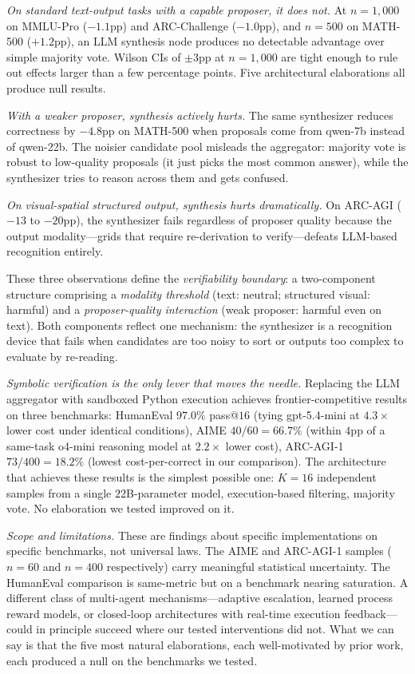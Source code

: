 \documentclass[11pt]{amsart}
\newcommand\1{{\mathds{1}}}
\theoremstyle{definition}
\theoremstyle{remark}
\numberwithin{equation}{section}
\begin{document}
\emph{On standard text-output tasks with a capable proposer, it does not.}
At $n\!=\!1{,}000$ on MMLU-Pro ($-1.1$pp) and ARC-Challenge ($-1.0$pp), and $n\!=\!500$ on MATH-500 ($+1.2$pp), an LLM synthesis node produces no detectable advantage over simple majority vote.
Wilson CIs of $\pm 3$pp at $n\!=\!1{,}000$ are tight enough to rule out effects larger than a few percentage points.
Five architectural elaborations all produce null results.

\emph{With a weaker proposer, synthesis actively hurts.}
The same synthesizer reduces correctness by $-4.8$pp on MATH-500 when proposals come from qwen-7b instead of qwen-22b.
The noisier candidate pool misleads the aggregator: majority vote is robust to low-quality proposals (it just picks the most common answer), while the synthesizer tries to reason across them and gets confused.

\emph{On visual-spatial structured output, synthesis hurts dramatically.}
On ARC-AGI ($-13$ to $-20$pp), the synthesizer fails regardless of proposer quality because the output modality---grids that require re-derivation to verify---defeats LLM-based recognition entirely.

These three observations define the \emph{verifiability boundary}: a two-component structure comprising a \emph{modality threshold} (text: neutral; structured visual: harmful) and a \emph{proposer-quality interaction} (weak proposer: harmful even on text).
Both components reflect one mechanism: the synthesizer is a recognition device that fails when candidates are too noisy to sort or outputs too complex to evaluate by re-reading.

\emph{Symbolic verification is the only lever that moves the needle.}
Replacing the LLM aggregator with sandboxed Python execution achieves frontier-competitive results on three benchmarks:
HumanEval $97.0\%$ pass@$16$ (tying gpt-5.4-mini at $4.3\times$ lower cost under identical conditions),
AIME $40/60 = 66.7\%$ (within $4$pp of a same-task o4-mini reasoning model at $2.2\times$ lower cost),
ARC-AGI-1 $73/400 = 18.2\%$ (lowest cost-per-correct in our comparison).
The architecture that achieves these results is the simplest possible one: $K\!=\!16$ independent samples from a single $22$B-parameter model, execution-based filtering, majority vote.
No elaboration we tested improved on it.

\emph{Scope and limitations.}
These are findings about specific implementations on specific benchmarks, not universal laws.
The AIME and ARC-AGI-1 samples ($n = 60$ and $n = 400$ respectively) carry meaningful statistical uncertainty.
The HumanEval comparison is same-metric but on a benchmark nearing saturation.
A different class of multi-agent mechanisms---adaptive escalation, learned process reward models, or closed-loop architectures with real-time execution feedback---could in principle succeed where our tested interventions did not.
What we can say is that the five most natural elaborations, each well-motivated by prior work, each produced a null on the benchmarks we tested.
\end{document}
